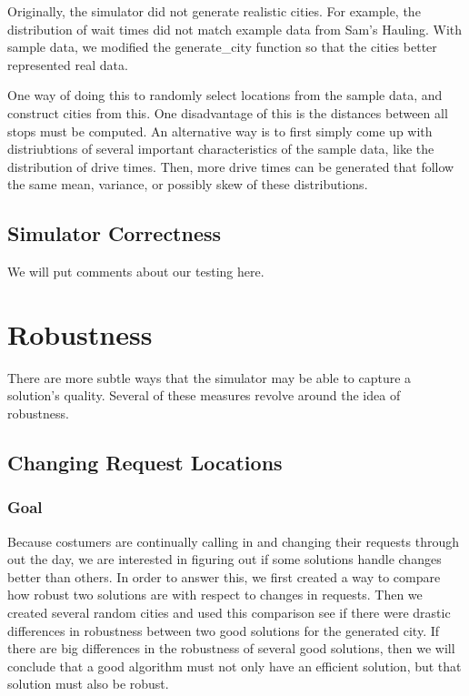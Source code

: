 \documentclass{article}
\begin{document}
Originally, the simulator did not generate realistic cities.
For example, the distribution of wait times did not match example data from Sam's Hauling.
With sample data, we modified the generate\_city function so that the cities better represented real data.

One way of doing this to randomly select locations from the sample data, and construct cities from this.
One disadvantage of this is the distances between all stops must be computed.
An alternative way is to first simply come up with distriubtions of several important characteristics of the sample data, like the distribution of drive times.
Then, more drive times can be generated that follow the same mean, variance, or possibly skew of these distributions.





\subsection{Simulator Correctness}


We will put comments about our testing here.



\section{Robustness}

There are more subtle ways that the simulator may be able to capture a solution's quality.
Several of these measures revolve around the idea of robustness.


\subsection{Changing Request Locations}


\subsubsection{Goal}

Because costumers are continually calling in and changing their requests through out the day, we are interested in figuring out if some solutions handle changes better than others.
In order to answer this, we first created a way to compare how robust two solutions are with respect to changes in requests.
Then we created several random cities and used this comparison see if there were drastic differences in robustness between two good solutions for the generated city.
If there are big differences in the robustness of several good solutions, then we will conclude that a good algorithm must not only have an efficient solution, but that solution must also be robust.
\end{document}

